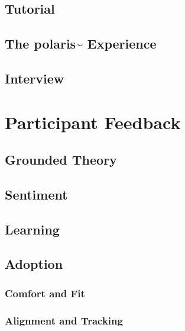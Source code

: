 \subsection{Tutorial}\label{sec: polaris-study-tutorial}

\subsection{The polaris\textasciitilde{} Experience}\label{sec: polaris-study-experience}

\subsection{Interview}\label{sec: polaris-study-interview}



\section{Participant Feedback}\label{sec: polaris-feedback}
\subsection{Grounded Theory}\label{sec: polaris-feedback-grounded}

\subsection{Sentiment}\label{sec: polaris-feedback-sentiment}

\subsection{Learning}\label{sec: polaris-feedback-learning}

\subsection{Adoption}\label{sec: polaris-feedback-adoption}
\subsubsection{Comfort and Fit}\label{sec: polaris-feedback-adoption-comfort}
\subsubsection{Alignment and Tracking}\label{sec: polaris-feedback-adoption-alignment}
